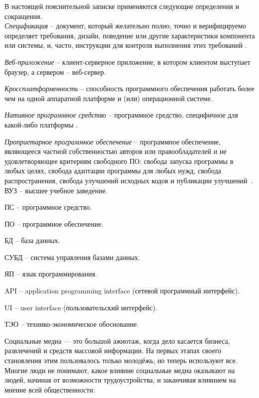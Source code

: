 \label{sec:definitions}

В настоящей пояснительной записке применяются следующие определения и сокращения.
\\

\emph{Спецификация} -- документ, который желательно полно, точно и верифицируемо определяет требования, дизайн, поведение или другие характеристики компонента или системы, и, часто, инструкции для контроля выполнения этих требований \cite{istqb_specification}.

\emph{Веб-приложение} -- клиент-серверное приложение, в котором клиентом выступает браузер, а сервером -- веб-сервер.

\emph{Кроссплатформенность} -- способность программного обеспечения работать более чем на одной аппаратной платформе и (или) операционной системе.

\emph{Нативное программное средство} -- программное средство, специфичное для какой-либо платформы \cite{habr_crossplatform}.

\emph{Проприетарное программное обеспечение} -- программное обеспечение, являющееся частной собственностью авторов или правообладателей и не удовлетворяющее критериям свободного ПО: свобода запуска программы в любых целях, свобода адаптации программы для любых нужд, свобода распространения, свобода улучшений исходных кодов и публикации улучшений~\cite{free_software}.
\\

ВУЗ -- высшее учебное заведение.

ПС -- программное средство.

ПО -- программное обеспечение.

БД -- база данных.

СУБД -- система управления базами данных.

ЯП -- язык программирования.

API -- application programming interface (сетевой программный интерфейс).

UI -- user interface (пользовательский интерфейс).

ТЭО -- технико-экономическое обоснование.


\label{sec:introduction}

Социальные медиа — это большой ажиотаж, когда дело касается
бизнеса, развлечений и средств массовой информации. На первых этапах
своего становления этим пользовалось только молодёжь, но теперь
используют все. Многие люди не понимают, какое влияние социальные
медиа оказывают на людей, начиная от возможности трудоустройства, и
заканчивая влиянием на мнение всей общественности.

